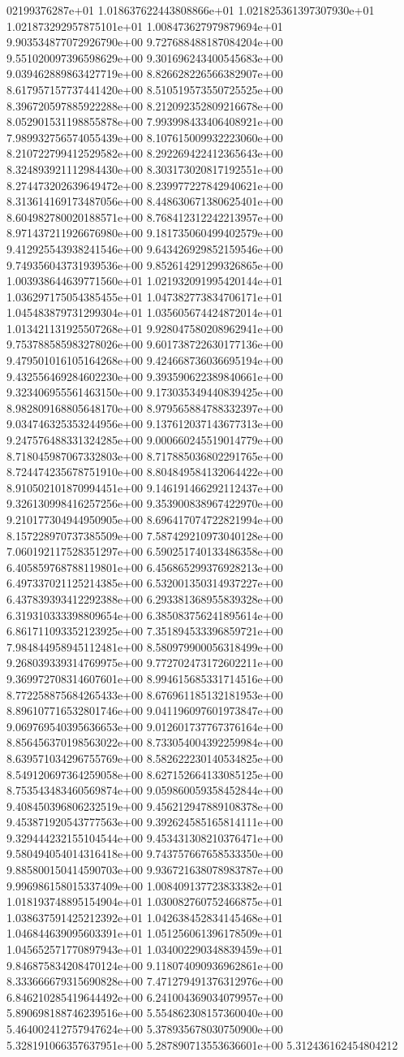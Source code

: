 02199376287e+01	1.018637622443808866e+01	1.021825361397307930e+01	1.021873292957875101e+01	1.008473627979879694e+01	9.903534877072926790e+00	9.727688488187084204e+00	9.551020097396598629e+00	9.301696243400545683e+00	9.039462889863427719e+00	8.826628226566382907e+00	8.617957157737441420e+00	8.510519573550725525e+00	8.396720597885922288e+00	8.212092352809216678e+00	8.052901531198855878e+00	7.993998433406408921e+00	7.989932756574055439e+00	8.107615009932223060e+00	8.210722799412529582e+00	8.292269422412365643e+00	8.324893921112984430e+00	8.303173020817192551e+00	8.274473202639649472e+00	8.239977227842940621e+00	8.313614169173487056e+00	8.448630671380625401e+00	8.604982780020188571e+00	8.768412312242213957e+00	8.971437211926676980e+00	9.181735060499402579e+00	9.412925543938241546e+00	9.643426929852159546e+00	9.749356043731939536e+00	9.852614291299326865e+00	1.003938644639771560e+01	1.021932091995420144e+01	1.036297175054385455e+01	1.047382773834706171e+01	1.045483879731299304e+01	1.035605674424872014e+01	1.013421131925507268e+01	9.928047580208962941e+00	9.753788585983278026e+00	9.601738722630177136e+00	9.479501016105164268e+00	9.424668736036695194e+00	9.432556469284602230e+00	9.393590622389840661e+00	9.323406955561463150e+00	9.173035349440839425e+00	8.982809168805648170e+00	8.979565884788332397e+00	9.034746325353244956e+00	9.137612037143677313e+00	9.247576488331324285e+00	9.000660245519014779e+00	8.718045987067332803e+00	8.717885036802291765e+00	8.724474235678751910e+00	8.804849584132064422e+00	8.910502101870994451e+00	9.146191466292112437e+00	9.326130998416257256e+00	9.353900838967422970e+00	9.210177304944950905e+00	8.696417074722821994e+00	8.157228970737385509e+00	7.587429210973040128e+00	7.060192117528351297e+00	6.590251740133486358e+00	6.405859768788119801e+00	6.456865299376928213e+00	6.497337021125214385e+00	6.532001350314937227e+00	6.437839393412292388e+00	6.293381368955839328e+00	6.319310333398809654e+00	6.385083756241895614e+00	6.861711093352123925e+00	7.351894533396859721e+00	7.984844958945112481e+00	8.580979900056318499e+00	9.268039339314769975e+00	9.772702473172602211e+00	9.369972708314607601e+00	8.994615685331714516e+00	8.772258875684265433e+00	8.676961185132181953e+00	8.896107716532801746e+00	9.041196097601973847e+00	9.069769540395636653e+00	9.012601737767376164e+00	8.856456370198563022e+00	8.733054004392259984e+00	8.639571034296755769e+00	8.582622230140534825e+00	8.549120697364259058e+00	8.627152664133085125e+00	8.753543483460569874e+00	9.059860059358452844e+00	9.408450396806232519e+00	9.456212947889108378e+00	9.453871920543777563e+00	9.392624585165814111e+00	9.329444232155104544e+00	9.453431308210376471e+00	9.580494054014316418e+00	9.743757667658533350e+00	9.885800150414590703e+00	9.936721638078983787e+00	9.996986158015337409e+00	1.008409137723833382e+01	1.018193748895154904e+01	1.030082760752466875e+01	1.038637591425212392e+01	1.042638452834145468e+01	1.046844639095603391e+01	1.051256061396178509e+01	1.045652571770897943e+01	1.034002290348839459e+01	9.846875834208470124e+00	9.118074090936962861e+00	8.333666679315690828e+00	7.471279491376312976e+00	6.846210285419644492e+00	6.241004369034079957e+00	5.890698188746239516e+00	5.554862308157360040e+00	5.464002412757947624e+00	5.378935678030750900e+00	5.328191066357637951e+00	5.287890713553636601e+00	5.312436162454804212